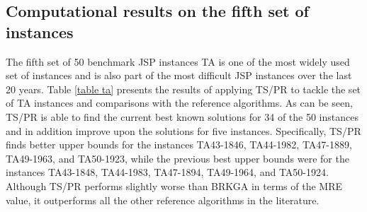 \documentclass[authoryear,12pt]{elsarticle}
\begin{document}
\subsection{Computational results on the fifth set of instances}
\label{subsec results 4}

The fifth set of 50 benchmark JSP instances TA is one of the most widely used set of instances and is also part of the most difficult JSP instances over the last 20 years.
Table \ref{table ta} presents the results of applying TS/PR to tackle the set of TA instances and comparisons with the reference algorithms. As can be seen, TS/PR is able to find the current best known solutions for 34 of the 50 instances and in addition improve upon the solutions for five instances. Specifically, TS/PR finds better upper bounds for the instances TA43-1846, TA44-1982, TA47-1889, TA49-1963, and TA50-1923, while the previous best upper bounds were for the instances TA43-1848, TA44-1983, TA47-1894, TA49-1964, and TA50-1924. Although TS/PR performs slightly worse than BRKGA in terms of the MRE value, it outperforms all the other reference algorithms in the literature.
\end{document}
